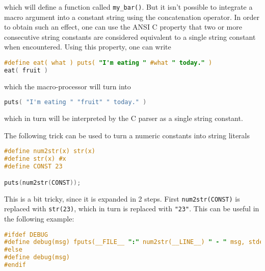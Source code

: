 which will define a function called \texttt{my\_bar()}. But it isn't possible
to integrate a macro argument into a constant string using the concatenation
operator. In order to obtain such an effect, one can use the ANSI C property
that two or more consecutive string constants are considered equivalent to a
single string constant when encountered. Using this property, one can write
\lstset{basicstyle=\scriptsize, numbers=left, captionpos=b, tabsize=4}
\begin{lstlisting}[caption=Section \thesection listing \arabic{preprocnt},language={C},
breaklines=true,xleftmargin=15pt, label=lst:section\thesection listing\arabic{preprocnt}]
#define eat( what ) puts( "I'm eating " #what " today." )
eat( fruit )
\end{lstlisting}

which the macro-processor will turn into
\lstset{basicstyle=\scriptsize, numbers=left, captionpos=b, tabsize=4}
\begin{lstlisting}[caption=Section \thesection listing \arabic{preprocnt},language={C},
breaklines=true,xleftmargin=15pt, label=lst:section\thesection listing\arabic{preprocnt}]
puts( "I'm eating " "fruit" " today." )
\end{lstlisting}

which in turn will be interpreted by the C parser as a single string constant.

The following trick can be used to turn a numeric constants into string
literals
\lstset{basicstyle=\scriptsize, numbers=left, captionpos=b, tabsize=4}
\begin{lstlisting}[caption=Section \thesection listing \arabic{preprocnt},language={C},
breaklines=true,xleftmargin=15pt, label=lst:section\thesection listing\arabic{preprocnt}]
#define num2str(x) str(x)
#define str(x) #x
#define CONST 23

puts(num2str(CONST));
\end{lstlisting}

This is a bit tricky, since it is expanded in 2 steps. First
\texttt{num2str(CONST)} is replaced with \texttt{str(23)}, which in turn is
replaced with \texttt{"23"}. This can be useful in the following example:
\lstset{basicstyle=\scriptsize, numbers=left, captionpos=b, tabsize=4}
\begin{lstlisting}[caption=Section \thesection listing \arabic{preprocnt},language={C},
breaklines=true,xleftmargin=15pt, label=lst:section\thesection listing\arabic{preprocnt}]
#ifdef DEBUG
#define debug(msg) fputs(__FILE__ ":" num2str(__LINE__) " - " msg, stderr)
#else
#define debug(msg)
#endif
\end{lstlisting}

